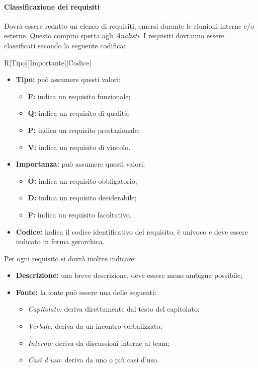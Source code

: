 \paragraph{Classificazione dei requisiti}
Dovrà essere redatto un elenco di requisiti, emersi durante le riunioni interne 
e/o esterne. Questo compito spetta agli \textsl{Analisti}. I requisiti dovranno 
essere classificati secondo la seguente codifica:
\begin{center}
R[Tipo][Importante][Codice]
\end{center}
\begin{itemize} 
  \item \textbf{Tipo:} può assumere questi valori:
  \begin{itemize}
    \item \textbf{F:} indica un requisito funzionale;
    \item \textbf{Q:} indica un requisito di qualità;
    \item \textbf{P:} indica un requisito prestazionale;
    \item \textbf{V:} indica un requisito di vincolo.
  \end{itemize}
  \item \textbf{Importanza:} può assumere questi valori:
  \begin{itemize}
    \item \textbf{O:} indica un requisito obbligatorio;
    \item \textbf{D:} indica un requisito desiderabile;
    \item \textbf{F:} indica un requisito facoltativo.
  \end{itemize}
  \item \textbf{Codice:} indica il codice identificativo del requisito, è 
  univoco e deve essere indicato in forma gerarchica.
\end{itemize}
Per ogni requisito si dovrà inoltre indicare: 
\begin{itemize}
  \item \textbf{Descrizione:} una breve descrizione, deve essere meno ambigua possibile;
  \item \textbf{Fonte:} la fonte può essere una delle seguenti:
  \begin{itemize}
    \item \textsl{Capitolato:} deriva direttamente dal testo del capitolato;
    \item \textsl{Verbale:} deriva da un incontro verbalizzato;
    \item \textsl{Interno:} deriva da discussioni interne al team;
    \item \textsl{Casi d'uso:} deriva da uno o più casi d'uso.
  \end{itemize}
\end{itemize} 
